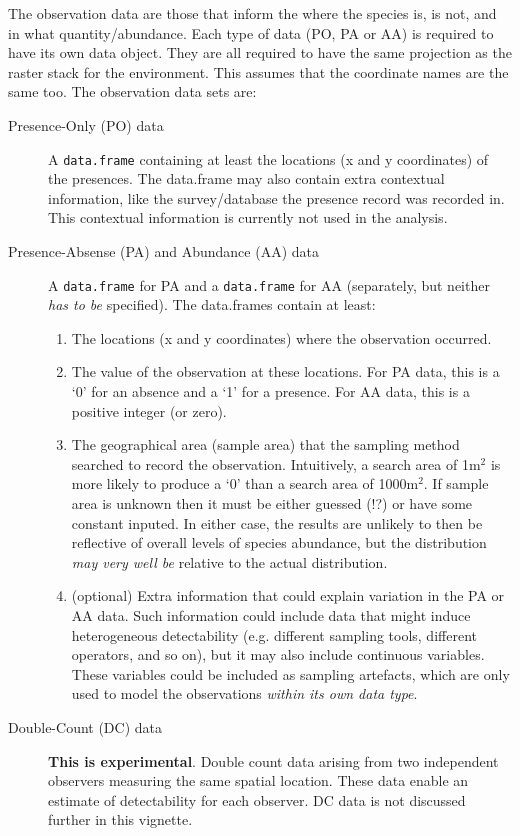 \documentclass[article,shortnames,nojss]{jss}\usepackage[]{graphicx}\usepackage[]{xcolor}
\begin{document}
The observation data are those that inform the where the species is, is not, and in what quantity/abundance. Each type of data (PO, PA or AA) is required to have its own data object. They are all required to have the same projection as the raster stack for the environment. This assumes that the coordinate names are the same too. The observation data sets are:
\begin{description}
  \item[Presence-Only (PO) data] A \texttt{data.frame} containing at least the locations (x and y coordinates) of the presences. The data.frame may also contain extra contextual information, like the survey/database the presence record was recorded in. This contextual information is currently not used in the analysis.
  \item[Presence-Absense (PA) and Abundance (AA) data] A \texttt{data.frame} for PA and a \texttt{data.frame} for AA (separately, but neither \textit{has to be} specified). The data.frames contain at least: 
  \begin{enumerate}
    \item The locations (x and y coordinates) where the observation occurred.
    \item The value of the observation at these locations. For PA data, this is a `0' for an absence and a `1' for a presence. For AA data, this is a positive integer (or zero).
    \item The geographical area (sample area) that the sampling method searched to record the observation. Intuitively, a search area of 1m$^2$ is more likely to produce a `0' than a search area of 1000m$^2$. If sample area is unknown then it must be either guessed (!?) or have some constant inputed. In either case, the results are unlikely to then be reflective of overall levels of species abundance, but the distribution \textit{may very well be} relative to the actual distribution.
    \item (optional) Extra information that could explain variation in the PA or AA data. Such information could include data that might induce heterogeneous detectability (e.g. different sampling tools, different operators, and so on), but it may also include continuous variables. These variables could be included as sampling artefacts, which are only used to model the observations \textit{within its own data type}.
  \end{enumerate}
  \item[Double-Count (DC) data] \textbf{This is experimental}. Double count data arising from two independent observers measuring the same spatial location. These data enable an estimate of detectability for each observer. DC data is not discussed further in this vignette.
\end{description}
\end{document}
